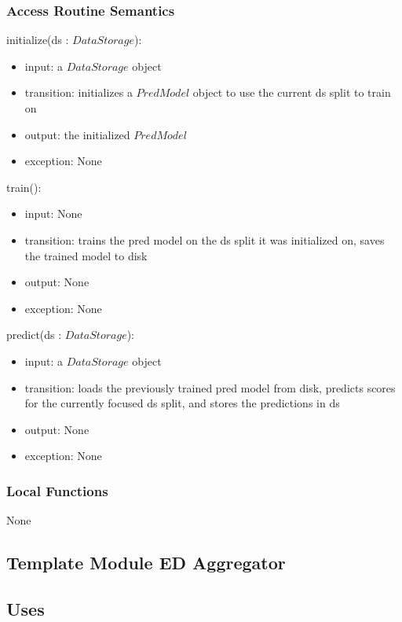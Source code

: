 \documentclass[12pt, titlepage]{article}
\begin{document}
\subsubsection{Access Routine Semantics}

\noindent initialize(ds : $DataStorage$):
\begin{itemize}
\item input: a $DataStorage$ object
\item transition: initializes a $PredModel$ object to use the current ds split to train on
\item output: the initialized $PredModel$
\item exception: None
\end{itemize}

\noindent train():
\begin{itemize}
\item input: None
\item transition: trains the pred model on the ds split it was initialized on, saves the trained model to disk
\item output: None
\item exception: None
\end{itemize}

\noindent predict(ds : $DataStorage$):
\begin{itemize}
\item input: a $DataStorage$ object
\item transition: loads the previously trained pred model from disk, predicts scores for the currently focused ds split, and stores the predictions in ds
\item output: None
\item exception: None
\end{itemize}

\subsubsection{Local Functions}

None


\subsection{Template Module ED Aggregator}

\subsection{Uses}
\end{document}

